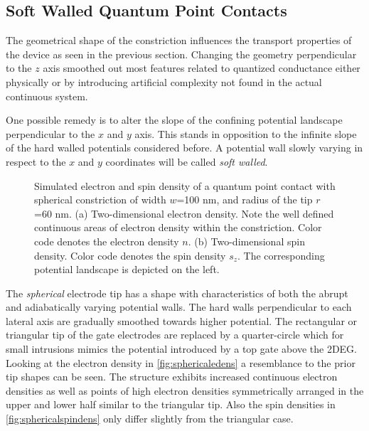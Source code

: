 \subsection{Soft Walled Quantum Point Contacts}
The geometrical shape of the constriction influences the transport properties of the device as seen in the previous section. Changing the geometry perpendicular to the $z$ axis smoothed out most features related to quantized conductance either physically or by introducing artificial complexity not found in the actual continuous system.\par
One possible remedy is to alter the slope of the confining potential landscape perpendicular to the $x$ and $y$ axis. This stands in opposition to the infinite slope of the hard walled potentials considered before. A potential wall slowly varying in respect to the $x$ and $y$ coordinates will be called \emph{soft walled}.\par
\begin{figure}[h]
  \caption{Simulated electron and spin density of a quantum point contact with spherical constriction of width $w$=100 nm, and radius of the tip $r$=60 nm. (a) Two-dimensional electron density. Note the well defined continuous areas of electron density within the constriction. Color code denotes the electron density $n$. (b) Two-dimensional spin density. Color code denotes the spin density $s_z$. The corresponding potential landscape is depicted on the left.}
\end{figure}
The \emph{spherical} electrode tip has a shape with characteristics of both the abrupt and adiabatically varying potential walls. The hard walls perpendicular to each lateral axis are gradually smoothed towards higher potential. The rectangular or triangular tip of the gate electrodes are replaced by a quarter-circle which for small intrusions mimics the potential introduced by a top gate above the 2DEG. Looking at the electron density in \cref{fig:sphericaledens} a resemblance to the prior tip shapes can be seen. The structure exhibits increased continuous electron densities as well as points of high electron densities symmetrically arranged in the upper and lower half similar to the triangular tip. Also the spin densities in \cref{fig:sphericalspindens} only differ slightly from the triangular case.\par
